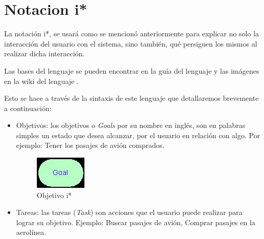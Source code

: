 \section{Notacion i*}
    \par La notación \gls{i*}, se usará como se mencionó anteriormente para explicar no solo la interacción del usuario con el sistema, sino también, qué persiguen los mismos al realizar dicha interacción.
    \par Las bases del lenguaje se pueden encontrar en la guía del lenguaje \cite{Dalpiaz2016} y las imágenes en la wiki del lenguaje \cite{No-mention2011}.
    \par Esto se hace a través de la sintaxis de este lenguaje que detallaremos brevemente a continuación:
    \begin{itemize}
        \item Objetivos: los objetivos o \textit{Goals} por su nombre en inglés, son en palabras simples un estado que desea alcanzar, por el usuario en relación con algo. Por ejemplo: \guillemotleft Tener los pasajes de avión comprados\guillemotright.
        
        \begin{figure}[H]
            \centering
            \includegraphics{media/imagenes/i_star/sintaxis/goal.jpg}
            \caption{Objetivo \gls{i*}}
        \end{figure}

        \item Tareas: las tareas (\textit{Task}) son acciones que el usuario puede realizar para lograr su objetivo. Ejemplo: \guillemotleft Buscar pasajes de avión\guillemotright, \guillemotleft Comprar pasajes en la aerolínea\guillemotright.
        

\end{itemize}
